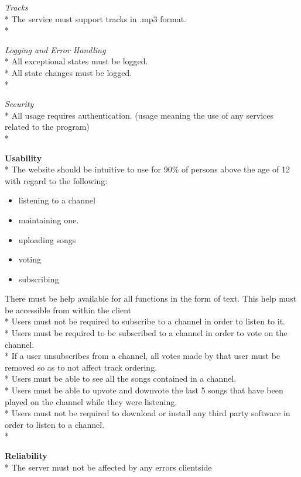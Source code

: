 \documentclass[a4paper,11pt,report]{article}
\begin{document}
\textit{Tracks} \\*
The service must support tracks in .mp3 format. \\*

\textit{Logging and Error Handling} \\*
All exceptional states must be logged.\\*
All state changes must be logged.\\*

\textit{Security} \\*
All usage requires authentication. (usage meaning the use of any services related to the program)\\*

\textbf{Usability} \\*
The website should be intuitive to use for 90\% of persons above the age of 12 with regard to the following:
\begin{itemize}
\item listening to a channel
\item maintaining one. 
\item uploading songs
\item voting
\item subscribing
\end{itemize}

There must be help available for all functions in the form of text. This help must be accessible from within the client \\*
Users must not be required to subscribe to a channel in order to listen to it. \\*
Users must be required to be subscribed to a channel in order to vote on the channel. \\*
If a user unsubscribes from a channel, all votes made by that user must be removed so as to not affect track ordering. \\*
Users must be able to see all the songs contained in a channel. \\*
Users must be able to upvote and downvote the last 5 songs that have been played on the channel while they were listening. \\*
Users must not be required to download or install any third party software in order to listen to a channel. \\*

\textbf{Reliability} \\*
The server must not be affected by any errors clientside
\end{document}
